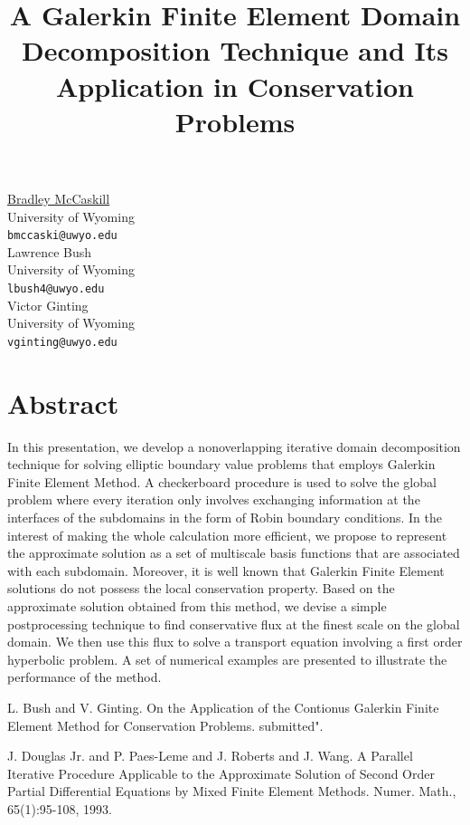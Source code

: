 \documentclass[article, A4, 11pt]{llncs}%
\begin{document}
\title{A Galerkin Finite Element Domain Decomposition Technique and Its Application in Conservation Problems}
 \author{} \institute{}
\maketitle
\begin{center}
{\large \underline{Bradley McCaskill}}\\
University of Wyoming\\
{\tt bmccaski@uwyo.edu}
\\ \vspace{4mm}
{\large Lawrence Bush}\\
University of Wyoming\\
{\tt lbush4@uwyo.edu}
\\ \vspace{4mm}
{\large Victor Ginting}\\
University of Wyoming\\
{\tt vginting@uwyo.edu}
\end{center}

\section*{Abstract}
In this presentation, we develop a nonoverlapping iterative domain decomposition technique for solving elliptic boundary value problems that employs Galerkin Finite Element Method. A checkerboard procedure is used to solve the global problem where every iteration only involves exchanging information at the interfaces of the subdomains in the form of Robin boundary conditions. In the interest of making the whole calculation more efficient, we propose to represent the approximate solution as a set of multiscale basis functions that are associated with each subdomain. Moreover, it is well known that Galerkin Finite Element solutions do not possess the local conservation property. Based on the approximate solution obtained from this method, we devise a simple postprocessing technique to find conservative flux at the finest scale on the global domain. We then use this flux to solve a transport equation involving a first order hyperbolic problem. A set of numerical examples are presented to illustrate the performance of the method.


\begin{thebibliography}{10}
{\sc L. Bush and V. Ginting}. {On the Application of the Contionus Galerkin Finite Element Method for Conservation Problems}. submitted".

{\sc J. Douglas Jr. and P. Paes-Leme and J. Roberts and J. Wang}. {A Parallel Iterative Procedure Applicable to the Approximate Solution of Second Order Partial Differential Equations by Mixed Finite Element Methods}. Numer. Math., 65(1):95-108, 1993.
\end{thebibliography} %
\end{document}
